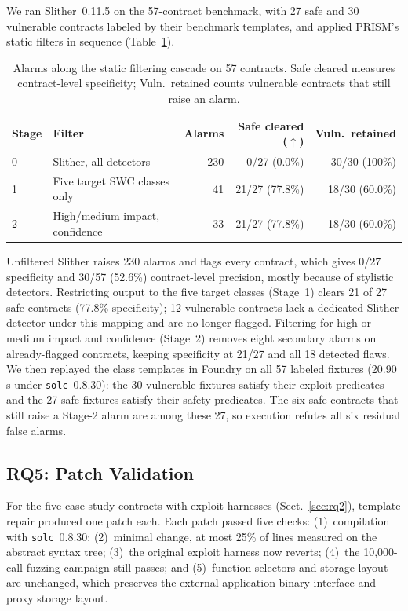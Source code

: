\documentclass[runningheads]{llncs}
\begin{document}
We ran Slither~0.11.5 on the 57-contract benchmark, with 27 safe and 30 vulnerable contracts labeled by their benchmark templates, and applied PRISM's static filters in sequence (Table~\ref{tab:cascade_routing}).

\begin{table}[t]
\centering
\caption{Alarms along the static filtering cascade on 57 contracts. Safe cleared measures contract-level specificity; Vuln.\ retained counts vulnerable contracts that still raise an alarm.}
\label{tab:cascade_routing}
\small
\setlength{\tabcolsep}{2.2pt}
\begin{tabular}{llrrr}
\toprule
Stage & Filter & Alarms & Safe cleared ($\uparrow$) & Vuln.\ retained \\
\midrule
0 & Slither, all detectors                 & 230 & 0/27 (0.0\%)          & 30/30 (100\%) \\
1 & Five target SWC classes only           & 41  & 21/27 (77.8\%)        & 18/30 (60.0\%) \\
2 & High/medium impact, confidence         & 33  & 21/27 (77.8\%)        & 18/30 (60.0\%) \\
\bottomrule
\end{tabular}
\end{table}

Unfiltered Slither raises 230 alarms and flags every contract, which gives 0/27 specificity and 30/57 (52.6\%) contract-level precision, mostly because of stylistic detectors. Restricting output to the five target classes (Stage~1) clears 21 of 27 safe contracts (77.8\% specificity); 12 vulnerable contracts lack a dedicated Slither detector under this mapping and are no longer flagged. Filtering for high or medium impact and confidence (Stage~2) removes eight secondary alarms on already-flagged contracts, keeping specificity at 21/27 and all 18 detected flaws. We then replayed the class templates in Foundry on all 57 labeled fixtures (20.90\,s under \texttt{solc}~0.8.30): the 30 vulnerable fixtures satisfy their exploit predicates and the 27 safe fixtures satisfy their safety predicates. The six safe contracts that still raise a Stage-2 alarm are among these 27, so execution refutes all six residual false alarms.

\subsection{RQ5: Patch Validation}
\label{sec:rq5}

For the five case-study contracts with exploit harnesses (Sect.~\ref{sec:rq2}), template repair produced one patch each. Each patch passed five checks: (1)~compilation with \texttt{solc}~0.8.30; (2)~minimal change, at most 25\% of lines measured on the abstract syntax tree; (3)~the original exploit harness now reverts; (4)~the 10,000-call fuzzing campaign still passes; and (5)~function selectors and storage layout are unchanged, which preserves the external application binary interface and proxy storage layout.
\end{document}
